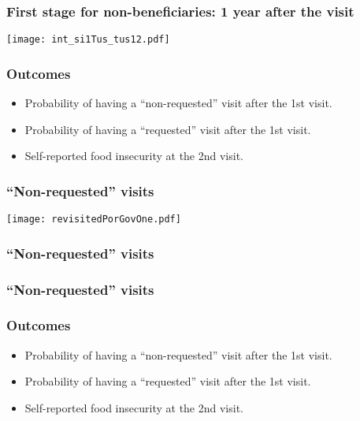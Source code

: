 \documentclass{beamer}
\begin{document}
\begin{frame}
\frametitle{First stage for non-beneficiaries: 1 year after the visit}
\begin{center}
\texttt{[image: int\_si1Tus\_tus12.pdf]}
\label{int_si1Tus_tus12.pdf}
\end{center}
\end{frame}

\begin{frame}
\frametitle{Outcomes}
\begin{itemize}
	\item Probability of having a ``non-requested'' visit after the 1st visit.
	\item {\color{gray}Probability of having a ``requested'' visit after the 1st visit.}
	\item {\color{gray}Self-reported food insecurity at the 2nd visit.}
\end{itemize}
\end{frame}

\begin{frame}
\frametitle{``Non-requested'' visits}
\begin{center}
	\texttt{[image: revisitedPorGovOne.pdf]}
	\label{revisitedPorGovOne}
\end{center}
\end{frame}

\begin{frame}
\frametitle{``Non-requested'' visits}
\begin{figure}

\end{figure}
\end{frame}

\begin{frame}
\frametitle{``Non-requested'' visits}
\begin{figure}

\end{figure}
\end{frame}

\begin{frame}
\frametitle{Outcomes}
\begin{itemize}
	\item {\color{gray}Probability of having a ``non-requested'' visit after the 1st visit.}
	\item Probability of having a ``requested'' visit after the 1st visit.
	\item {\color{gray}Self-reported food insecurity at the 2nd visit.}
\end{itemize}
\end{frame}
\end{document}
